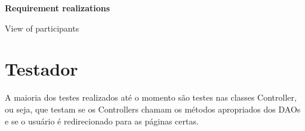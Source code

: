 \documentclass[12pt,letterpaper]{article}
\begin{document}
\vspace{1cm}
{\large {\bf Requirement realizations}}
\vspace{0.5cm}


View of participants








\pagebreak



\section{Testador}

A maioria dos testes realizados até o momento são testes nas classes Controller, ou seja, que testam se os Controllers chamam os métodos apropriados dos DAOs e se o usuário é redirecionado para as páginas certas. 
\end{document}
